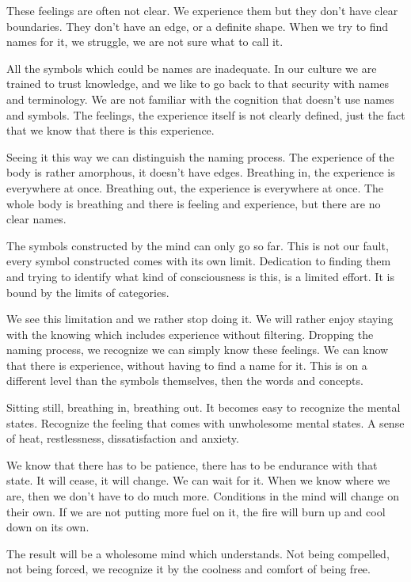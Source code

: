 These feelings are often not clear. We experience them but they don't
have clear boundaries. They don't have an edge, or a definite shape.
When we try to find names for it, we struggle, we are not sure what to
call it.

All the symbols which could be names are inadequate. In our culture we
are trained to trust knowledge, and we like to go back to that security
with names and terminology. We are not familiar with the cognition that
doesn't use names and symbols. The feelings, the experience itself is
not clearly defined, just the fact that we know that there is this
experience.

Seeing it this way we can distinguish the naming process. The experience
of the body is rather amorphous, it doesn't have edges. Breathing in,
the experience is everywhere at once. Breathing out, the experience is
everywhere at once. The whole body is breathing and there is feeling and
experience, but there are no clear names.

The symbols constructed by the mind can only go so far. This is not our
fault, every symbol constructed comes with its own limit. Dedication to
finding them and trying to identify what kind of consciousness is this,
is a limited effort. It is bound by the limits of categories.

We see this limitation and we rather stop doing it. We will rather enjoy
staying with the knowing which includes experience without filtering.
Dropping the naming process, we recognize we can simply know these
feelings. We can know that there is experience, without having to find a
name for it. This is on a different level than the symbols themselves,
then the words and concepts.

Sitting still, breathing in, breathing out. It becomes easy to recognize
the mental states. Recognize the feeling that comes with unwholesome
mental states. A sense of heat, restlessness, dissatisfaction and
anxiety.

We know that there has to be patience, there has to be endurance with
that state. It will cease, it will change. We can wait for it. When we
know where we are, then we don't have to do much more. Conditions in the
mind will change on their own. If we are not putting more fuel on it,
the fire will burn up and cool down on its own.

The result will be a wholesome mind which understands. Not being
compelled, not being forced, we recognize it by the coolness and comfort
of being free.

